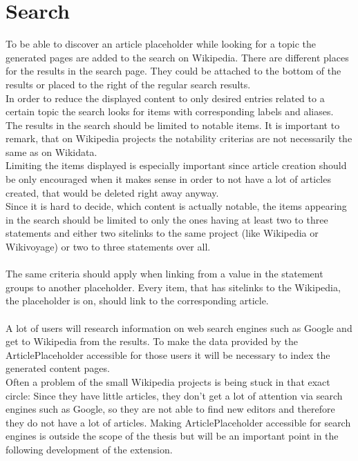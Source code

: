 \section{Search}
To be able to discover an article placeholder while looking for a topic the generated pages are added to the search on Wikipedia. There are different places for the results in the search page. They could be attached to the bottom of the results or placed to the right of the regular search results. \\
In order to reduce the displayed content to only desired entries related to a certain topic the search looks for items with corresponding labels and aliases.  \\
The results in the search should be limited to notable items. It is important to remark, that on Wikipedia projects the notability criterias  are not necessarily the same as on Wikidata. \\
 Limiting the items displayed is especially important since article creation should be only encouraged when it makes sense in order to not have a lot of articles created, that would be deleted right away anyway.\\
Since it is hard to decide, which content is actually notable, the items appearing in the search should be limited to only the ones having at least two to three statements and either two sitelinks to the same project (like Wikipedia or Wikivoyage) or two to three statements over all. \\
\\
The same criteria should apply when linking from a value in the statement groups to another placeholder. Every item, that has sitelinks to the Wikipedia, the placeholder is on, should link to the corresponding article.  \\
\\
A lot of users will research information on web search engines such as Google and get to Wikipedia from the results. To make the data provided by the ArticlePlaceholder accessible for those users it will be necessary to index the generated content pages.  \\
Often a problem of the small Wikipedia projects is being stuck in that exact circle: Since they have little articles, they don't get a lot of attention via search engines such as Google, so they are not able to find new editors and therefore they do not have a lot of articles. 
Making ArticlePlaceholder accessible for search engines is outside the scope of the thesis but will be an important point in the following development of the extension. 
